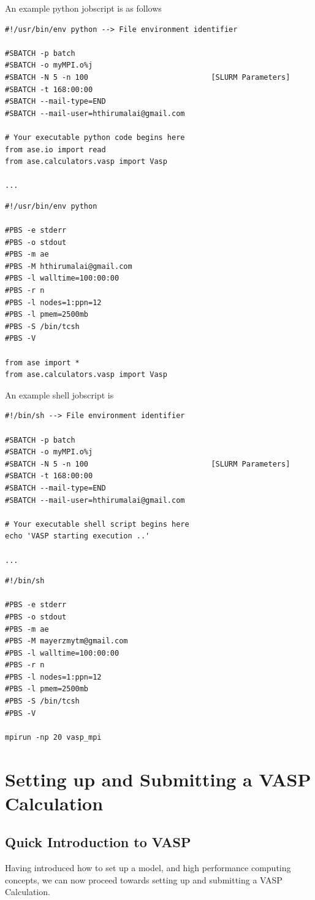 \documentclass[11pt]{article}
\begin{document}
An example python jobscript is  as follows
\begin{verbatim}
#!/usr/bin/env python --> File environment identifier

#SBATCH -p batch
#SBATCH -o myMPI.o%j
#SBATCH -N 5 -n 100                            [SLURM Parameters]
#SBATCH -t 168:00:00
#SBATCH --mail-type=END
#SBATCH --mail-user=hthirumalai@gmail.com

# Your executable python code begins here
from ase.io import read
from ase.calculators.vasp import Vasp

...
\end{verbatim}

\begin{verbatim}
#!/usr/bin/env python

#PBS -e stderr
#PBS -o stdout
#PBS -m ae
#PBS -M hthirumalai@gmail.com
#PBS -l walltime=100:00:00
#PBS -r n
#PBS -l nodes=1:ppn=12
#PBS -l pmem=2500mb
#PBS -S /bin/tcsh
#PBS -V

from ase import *
from ase.calculators.vasp import Vasp
\end{verbatim}

An example shell jobscript is
\begin{verbatim}
#!/bin/sh --> File environment identifier

#SBATCH -p batch
#SBATCH -o myMPI.o%j
#SBATCH -N 5 -n 100                            [SLURM Parameters]
#SBATCH -t 168:00:00
#SBATCH --mail-type=END
#SBATCH --mail-user=hthirumalai@gmail.com

# Your executable shell script begins here
echo 'VASP starting execution ..'

...
\end{verbatim}

\begin{verbatim}
#!/bin/sh

#PBS -e stderr
#PBS -o stdout
#PBS -m ae
#PBS -M mayerzmytm@gmail.com
#PBS -l walltime=100:00:00
#PBS -r n
#PBS -l nodes=1:ppn=12
#PBS -l pmem=2500mb
#PBS -S /bin/tcsh
#PBS -V

mpirun -np 20 vasp_mpi
\end{verbatim}

\section{Setting up and Submitting a VASP Calculation}
\label{sec:orgc27d680}
\subsection{Quick Introduction to VASP}
\label{sec:org5c8904d}
Having introduced how to set up a model, and high performance computing concepts, we can now proceed towards setting up and submitting a VASP Calculation.
\end{document}
